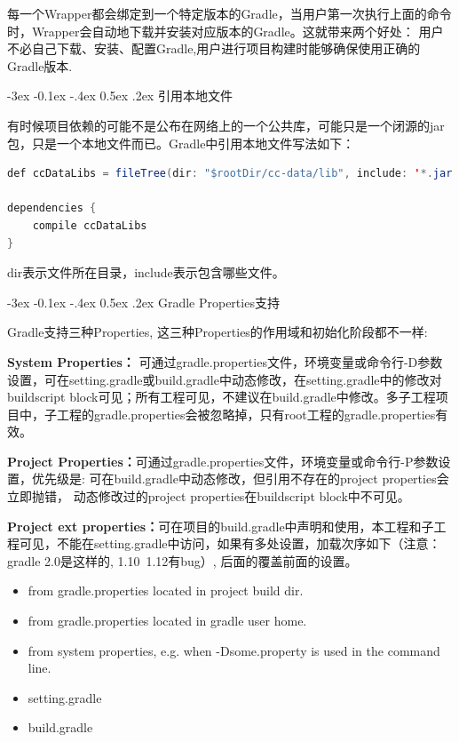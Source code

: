 \documentclass[12pt]{book}
\makeatletter
\numberwithin{dummy}{section}
\theoremstyle{ocrenumbox}
\theoremstyle{blacknumex}
\theoremstyle{blacknumbox}
\theoremstyle{ocrenum}
\renewcommand{\subsection}{\@startsection {subsection}{2}{\z@}
	{-3ex \@plus -0.1ex \@minus -.4ex}
	{0.5ex \@plus.2ex }
	{\normalfont\sffamily\bfseries}}
\makeatother
\begin{document}
每一个Wrapper都会绑定到一个特定版本的Gradle，当用户第一次执行上面的命令时，Wrapper会自动地下载并安装对应版本的Gradle。这就带来两个好处：
用户不必自己下载、安装、配置Gradle,用户进行项目构建时能够确保使用正确的Gradle版本.

\subsection{引用本地文件}

有时候项目依赖的可能不是公布在网络上的一个公共库，可能只是一个闭源的jar包，只是一个本地文件而已。Gradle中引用本地文件写法如下：

\begin{lstlisting}[language=Java]
def ccDataLibs = fileTree(dir: "$rootDir/cc-data/lib", include: '*.jar')

dependencies {
	compile ccDataLibs
}
\end{lstlisting}

dir表示文件所在目录，include表示包含哪些文件。

\subsection{Gradle Properties支持}

Gradle支持三种Properties, 这三种Properties的作用域和初始化阶段都不一样:

\textbf{System Properties：}
可通过gradle.properties文件，环境变量或命令行-D参数设置，可在setting.gradle或build.gradle中动态修改，在setting.gradle中的修改对buildscript block可见；所有工程可见，不建议在build.gradle中修改。多子工程项目中，子工程的gradle.properties会被忽略掉，只有root工程的gradle.properties有效。

\textbf{Project Properties：}可通过gradle.properties文件，环境变量或命令行-P参数设置，优先级是:
可在build.gradle中动态修改，但引用不存在的project properties会立即抛错，
动态修改过的project properties在buildscript block中不可见。

\textbf{Project ext properties：}可在项目的build.gradle中声明和使用，本工程和子工程可见，不能在setting.gradle中访问，如果有多处设置，加载次序如下（注意：gradle 2.0是这样的, 1.10~1.12有bug）, 后面的覆盖前面的设置。

\begin{itemize}
	\item {from gradle.properties located in project build dir.}
	\item {from gradle.properties located in gradle user home.}
	\item {from system properties, e.g. when -Dsome.property is used in the command line.}
	\item {setting.gradle}
	\item {build.gradle}
\end{itemize}
\end{document}

